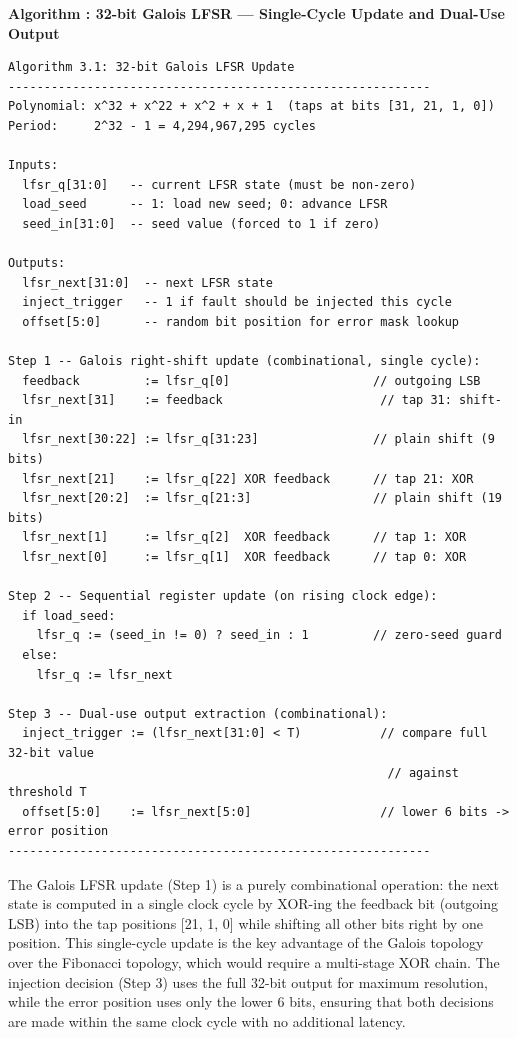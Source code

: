 \documentclass[
  12pt,
  a4paper]{report}
\begin{document}
\textbf{Algorithm : 32-bit Galois LFSR --- Single-Cycle Update and
Dual-Use Output}

\begin{verbatim}
Algorithm 3.1: 32-bit Galois LFSR Update
-----------------------------------------------------------
Polynomial: x^32 + x^22 + x^2 + x + 1  (taps at bits [31, 21, 1, 0])
Period:     2^32 - 1 = 4,294,967,295 cycles

Inputs:
  lfsr_q[31:0]   -- current LFSR state (must be non-zero)
  load_seed      -- 1: load new seed; 0: advance LFSR
  seed_in[31:0]  -- seed value (forced to 1 if zero)

Outputs:
  lfsr_next[31:0]  -- next LFSR state
  inject_trigger   -- 1 if fault should be injected this cycle
  offset[5:0]      -- random bit position for error mask lookup

Step 1 -- Galois right-shift update (combinational, single cycle):
  feedback         := lfsr_q[0]                    // outgoing LSB
  lfsr_next[31]    := feedback                      // tap 31: shift-in
  lfsr_next[30:22] := lfsr_q[31:23]                // plain shift (9 bits)
  lfsr_next[21]    := lfsr_q[22] XOR feedback      // tap 21: XOR
  lfsr_next[20:2]  := lfsr_q[21:3]                 // plain shift (19 bits)
  lfsr_next[1]     := lfsr_q[2]  XOR feedback      // tap 1: XOR
  lfsr_next[0]     := lfsr_q[1]  XOR feedback      // tap 0: XOR

Step 2 -- Sequential register update (on rising clock edge):
  if load_seed:
    lfsr_q := (seed_in != 0) ? seed_in : 1         // zero-seed guard
  else:
    lfsr_q := lfsr_next

Step 3 -- Dual-use output extraction (combinational):
  inject_trigger := (lfsr_next[31:0] < T)           // compare full 32-bit value
                                                     // against threshold T
  offset[5:0]    := lfsr_next[5:0]                  // lower 6 bits -> error position
-----------------------------------------------------------
\end{verbatim}

The Galois LFSR update (Step 1) is a purely combinational operation: the
next state is computed in a single clock cycle by XOR-ing the feedback
bit (outgoing LSB) into the tap positions {[}21, 1, 0{]} while shifting
all other bits right by one position. This single-cycle update is the
key advantage of the Galois topology over the Fibonacci topology, which
would require a multi-stage XOR chain. The injection decision (Step 3)
uses the full 32-bit output for maximum resolution, while the error
position uses only the lower 6 bits, ensuring that both decisions are
made within the same clock cycle with no additional latency.
\end{document}
